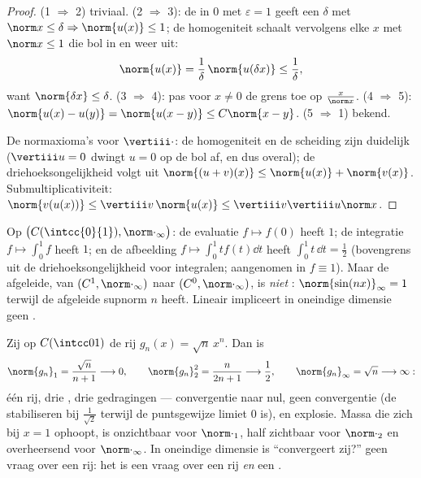 \begin{proof}
(1 $\Rightarrow$ 2) triviaal. (2 $\Rightarrow$ 3): de 
in $0$ met $\varepsilon = 1$ geeft een $\delta$ met $\norm x \leq
\delta \Rightarrow \norm{u(x)} \leq 1$; de homogeniteit schaalt
vervolgens elke $x$ met $\norm x \leq 1$ die bol in en weer uit:
\[
\norm{u(x)} = \frac1\delta\,\norm{u(\delta x)} \leq
\frac1\delta ,
\]
want $\norm{\delta x} \leq \delta$. (3 $\Rightarrow$ 4): pas voor
$x \neq 0$ de grens toe op $\frac{x}{\norm x}$. (4 $\Rightarrow$
5): $\norm{u(x) - u(y)} = \norm{u(x - y)} \leq C\norm{x - y}$. (5
$\Rightarrow$ 1) bekend.

De normaxioma's voor $\vertiii\cdot$: de homogeniteit en de
scheiding zijn duidelijk ($\vertiii u = 0$ dwingt $u = 0$ op de bol
af, en dus overal); de driehoeksongelijkheid volgt uit $\norm{(u +
v)(x)} \leq \norm{u(x)} + \norm{v(x)}$. Submultiplicativiteit:
$\norm{v(u(x))} \leq \vertiii v\,\norm{u(x)} \leq \vertiii v
\vertiii u \norm x$.
\end{proof}

\begin{example}\label{ex:b2:nvs:operatornorms}
Op $\bigl(C(\intcc{0}{1}), \norm\cdot_\infty\bigr)$: de evaluatie
$f \mapsto f(0)$ heeft  $1$; de integratie $f \mapsto
\int_0^1 f$ heeft  $1$; en de afbeelding $f \mapsto \int_0^1 t
f(t)\dd t$ heeft  $\int_0^1 t\,\dd t = \frac12$ (bovengrens uit
de driehoeksongelijkheid voor integralen; aangenomen in $f \equiv
1$). Maar de afgeleide, van $(C^1, \norm\cdot_\infty)$ naar $(C^0,
\norm\cdot_\infty)$, is \emph{niet} :
$\norm{\sin(nx)}_\infty = 1$ terwijl de afgeleide supnorm $n$
heeft. Lineair impliceert in oneindige dimensie geen .
\end{example}

\begin{example}\label{ex:b2:nvs:sqrtnxn}
Zij op $C(\intcc01)$ de rij $g_n(x) = \sqrt{n}\,x^n$. Dan is
\[
\norm{g_n}_1 = \frac{\sqrt n}{n + 1} \longrightarrow 0,
\qquad
\norm{g_n}_2^2 = \frac{n}{2n + 1} \longrightarrow \frac12,
\qquad
\norm{g_n}_\infty = \sqrt n \longrightarrow \infty :
\]
één rij, drie , drie gedragingen --- convergentie naar nul,
geen convergentie (de  stabiliseren bij $\frac1{\sqrt2}$
terwijl de puntsgewijze limiet $0$ is), en explosie. Massa die zich
bij $x = 1$ ophoopt, is onzichtbaar voor $\norm\cdot_1$, half
zichtbaar voor $\norm\cdot_2$ en overheersend voor
$\norm\cdot_\infty$. In oneindige dimensie is ``convergeert zij?''
geen vraag over een rij: het is een vraag over een rij \emph{en}
een .
\end{example}

